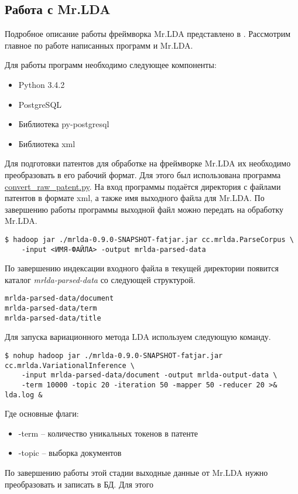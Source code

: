 \subsection{Работа с Mr.LDA}
Подробное описание работы фреймворка Mr.LDA представлено в \cite{mrlda}. Рассмотрим главное по работе 
написанных программ и Mr.LDA.

Для работы программ необходимо следующее компоненты:
\begin{itemize}
    \item Python 3.4.2
    \item PostgreSQL
    \item Библиотека py-postgresql
    \item Библиотека xml
\end{itemize}

Для подготовки патентов для обработке на фреймворке Mr.LDA их необходимо преобразовать в его рабочий формат. 
Для этого был использована программа 
\href{https://github.com/SemPatent/Golubev/blob/master/convert_raw_patent.py}{convert\_raw\_patent.py}. На 
вход программы подаётся директория с файлами патентов в формате xml, а также имя выходного файла для Mr.LDA.
По завершению работы программы выходной файл можно передать на обработку Mr.LDA. 
\begin{lstlisting}
$ hadoop jar ./mrlda-0.9.0-SNAPSHOT-fatjar.jar cc.mrlda.ParseCorpus \
    -input <ИМЯ-ФАЙЛА> -output mrlda-parsed-data
\end{lstlisting}
По завершению индексации входного файла в текущей директории появится каталог \emph{mrlda-parsed-data} со следующей структурой.
\begin{lstlisting}
mrlda-parsed-data/document
mrlda-parsed-data/term
mrlda-parsed-data/title
\end{lstlisting}
Для запуска вариационного метода LDA используем следующую команду. 
\begin{lstlisting}
$ nohup hadoop jar ./mrlda-0.9.0-SNAPSHOT-fatjar.jar cc.mrlda.VariationalInference \
    -input mrlda-parsed-data/document -output mrlda-output-data \
    -term 10000 -topic 20 -iteration 50 -mapper 50 -reducer 20 >& lda.log &
\end{lstlisting}
Где основные флаги:
\begin{itemize}
    \item -term -- количество уникальных токенов в патенте
    \item -topic -- выборка документов
\end{itemize}
По завершению работы этой стадии выходные данные от Mr.LDA нужно преобразовать и записать в БД. Для этого 
